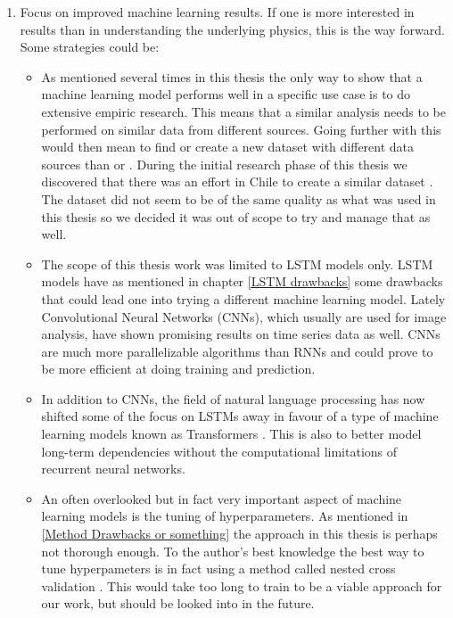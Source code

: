 \begin{enumerate}
    \item Focus on improved machine learning results. If one is more interested in results than in understanding the underlying physics, this is the way forward. Some strategies could be:
    \begin{itemize}
        \item As mentioned several times in this thesis the only way to show that a machine learning model performs well in a specific use case is to do extensive empiric research. This means that a similar analysis needs to be performed on similar data from different sources. Going further with this would then mean to find or create a new dataset with different data sources than \citet{CAMELS_GB} or \citet{CAMELS_US}. During the initial research phase of this thesis we discovered that there was an effort in Chile to create a similar dataset \citep{CAMELS_CL}. The dataset did not seem to be of the same quality as what was used in this thesis so we decided it was out of scope to try and manage that as well.
        \item The scope of this thesis work was limited to LSTM models only. LSTM models have as mentioned in chapter \ref{LSTM drawbacks} some drawbacks that could lead one into trying a different machine learning model. Lately Convolutional Neural Networks (CNNs), which usually are used for image analysis, have shown promising results on time series data as well. \citationneeded CNNs are much more parallelizable algorithms than RNNs \citationneeded and could prove to be more efficient at doing training and prediction.
        \item In addition to CNNs, the field of natural language processing has now shifted some of the focus on LSTMs away in favour of a type of machine learning models known as Transformers \citep{transformers}. This is also to better model long-term dependencies without the computational limitations of recurrent neural networks.
        \item An often overlooked but in fact very important aspect of machine learning models is the tuning of hyperparameters. As mentioned in \ref{Method Drawbacks or something} the approach in this thesis is perhaps not thorough enough. To the author's best knowledge the best way to tune hyperpameters is in fact using a method called nested cross validation \citationneeded. This would take too long to train to be a viable approach for our work, but should be looked into in the future.
    \end{itemize}

\end{enumerate}
